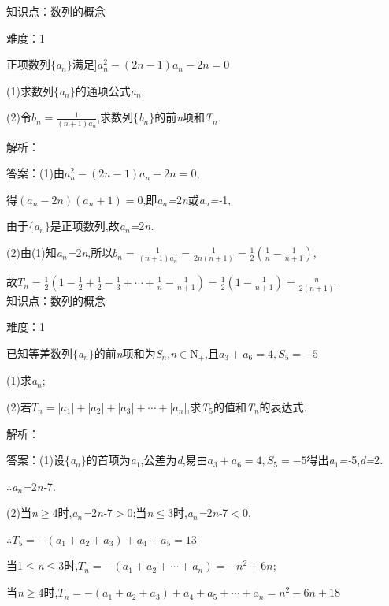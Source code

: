 \documentclass{article} %
\begin{document}
知识点：数列的概念

难度：1

 正项数列$\mathrm{\{}$\textit{a${}_{n}$}$\mathrm{\}}$满足]$a_n^2-(2n-1)a_n-2n=0$

 (1)求数列$\mathrm{\{}$\textit{a${}_{n}$}$\mathrm{\}}$的通项公式\textit{a${}_{n}$};

 (2)令$b_n=\frac{1}{(n+1)a_n}$,求数列$\mathrm{\{}$\textit{b${}_{n}$}$\mathrm{\}}$的前\textit{n}项和\textit{T${}_{n}$.}

解析：

 答案：(1)由$a_n^2-(2n-1)a_n-2n=0$,

得$(a_n-2n)(a_n+1)=0$,即\textit{a${}_{n}$=}2\textit{n}或\textit{a${}_{n}$=-}1,

由于$\mathrm{\{}$\textit{a${}_{n}$}$\mathrm{\}}$是正项数列,故\textit{a${}_{n}$=}2\textit{n.}

(2)由(1)知\textit{a${}_{n}$=}2\textit{n},所以$b_n=\frac{1}{(n+1)a_n}=\frac{1}{2n(n+1)}=\frac{1}{2}(\frac{1}{n}-\frac{1}{n+1})$,

故$T_n=\frac{1}{2}(1-\frac{1}{2}+\frac{1}{2}-\frac{1}{3}+\cdots +\frac{1}{n}-\frac{1}{n+1})=\frac{1}{2}(1-\frac{1}{n+1})=\frac{n}{2(n+1)}$ \\

知识点：数列的概念

难度：1

 已知等差数列$\mathrm{\{}$\textit{a${}_{n}$}$\mathrm{\}}$的前\textit{n}项和为\textit{S${}_{n}$},\textit{n}$\mathrm{\in}$N\textit{${}_{+}$},且$a_3+a_6=4,S_5=-5$

 (1)求\textit{a${}_{n}$};

 (2)若$T_n=|a_1|+|a_2|+|a_3|+\cdots+|a_n|$,求\textit{T}${}_{5}$的值和\textit{T${}_{n}$}的表达式\textit{.}

解析：

 答案：(1)设$\mathrm{\{}$\textit{a${}_{n}$}$\mathrm{\}}$的首项为\textit{a}${}_{1}$,公差为\textit{d},易由$a_3+a_6=4,S_5=-5$得出\textit{a}${}_{1}$\textit{=-}5,\textit{d=}2\textit{.}

\textit{$\therefore$a${}_{n}$=}2\textit{n-}7\textit{.}

(2)当\textit{n}$\mathrm{\ge}$4时,\textit{a${}_{n}$=}2\textit{n-}7\textit{$>$}0;当\textit{n}$\mathrm{\le}$3时,\textit{a${}_{n}$=}2\textit{n-}7\textit{$<$}0,

$\therefore T_5=-(a_1+a_2+a_3)+a_4+a_5=13$

当1$\mathrm{\le}$\textit{n}$\mathrm{\le}$3时,$T_n=-(a_1+a_2+\cdots+a_n)=-n^2+6n$;

当\textit{n}$\mathrm{\ge}$4时,$T_n=-(a_1+a_2+a_3)+a_4+a_5+\cdots+a_n=n^2-6n+18$
\end{document}
